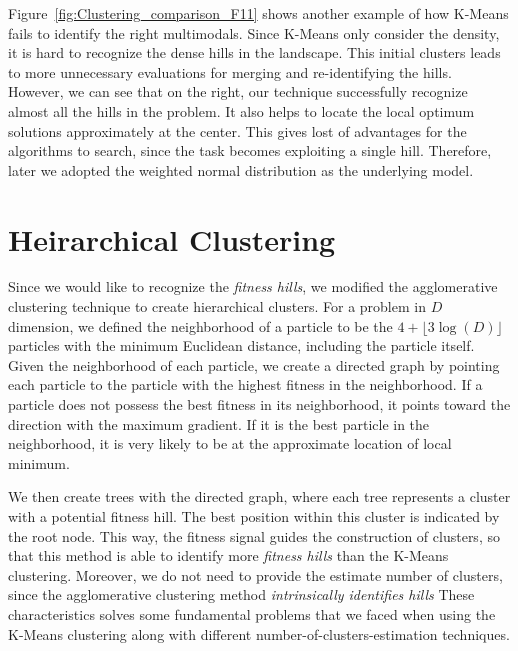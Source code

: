 Figure~\ref{fig:Clustering_comparison_F11} shows another example of how K-Means fails to identify the right multimodals.
Since K-Means only consider the density, it is hard to recognize the dense hills in the landscape. 
This initial clusters leads to more unnecessary evaluations for merging and re-identifying the hills.
However, we can see that on the right, our technique successfully recognize almost all the hills in the problem.
It also helps to locate the local optimum solutions approximately at the center.
This gives lost of advantages for the algorithms to search, since the task becomes exploiting a single hill.
Therefore, later we adopted the weighted normal distribution as the underlying model. 


\section{Heirarchical Clustering}\label{section:hierarchical}

Since we would like to recognize the \textit{fitness hills}, 
we modified the agglomerative clustering technique to create hierarchical clusters.
For a problem in $D$ dimension, we defined the neighborhood of a particle 
to be the $ 4 + \lfloor 3\log(D) \rfloor $ particles with the minimum Euclidean distance, including the particle itself.
Given the neighborhood of each particle, 
we create a directed graph by pointing each particle to the particle with the highest fitness in the neighborhood.
If a particle does not possess the best fitness in its neighborhood, it points toward the direction with the maximum gradient.
If it is the best particle in the neighborhood, it is very likely to be at the approximate location of local minimum.

We then create trees with the directed graph, 
where each tree represents a cluster with a potential fitness hill.
The best position within this cluster is indicated by the root node.  
This way, the fitness signal guides the construction of clusters, 
so that this method is able to identify more \textit{fitness hills} than the K-Means clustering.
Moreover, we do not need to provide the estimate number of clusters, 
since the agglomerative clustering method \textit{intrinsically identifies hills} 
These characteristics solves some fundamental problems that we faced when using the K-Means clustering along with different number-of-clusters-estimation techniques.

